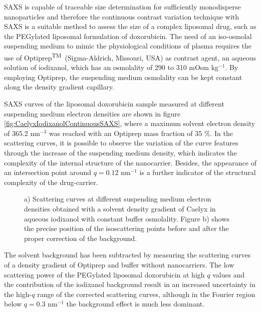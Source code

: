 SAXS is capable of traceable size determination for sufficiently monodisperse nanoparticles \citep{meli_traceable_2012} and therefore the continuous contrast variation technique with SAXS is a suitable method to assess the size of a complex liposomal drug, such as the PEGylated liposomal formulation of doxorubicin. The need of an iso-osmolal suspending medium to mimic the physiological conditions of plasma requires the use of Optiprep\textsuperscript{TM}\ (Sigma-Aldrich, Missouri, USA) as contrast agent, an aqueous solution of iodixanol, which has an osmolality of 290 to 310 mOsm kg$^{-1}$. By employing Optiprep, the suspending medium osmolality can be kept constant along the density gradient capillary.
 
SAXS curves of the liposomal doxorubicin sample measured at different suspending medium electron densities are shown in figure \ref{fig:CaelyxIodixanolContinuousSAXS}, where a maximum solvent electron density of 365.2 nm$^{-3}$ was reached with an Optiprep mass fraction of 35 $\%$. In the scattering curves, it is possible to observe the variation of the curve features through the increase of the suspending medium density, which indicates the complexity of the internal structure of the nanocarrier. Besides, the appearance of an intersection point around $q = 0.12$ nm$^{-1}$ is a further indicator of the structural complexity of the drug-carrier.

\begin{figure}
	\centering
		\qquad
		\caption[Continuous contrast variation experimental data of Caelyx.]{ a) Scattering curves at different suspending medium electron densities obtained with a solvent density gradient of Caelyx in aqueous iodixanol with constant buffer osmolality. Figure b) shows the precise position of the isoscattering points before and after the proper correction of the background.}
\end{figure}

The solvent background has been subtracted by measuring the scattering curves of a density gradient of Optiprep and buffer without nanocarriers. The low scattering power of the PEGylated liposomal doxorubicin at high $q$ values and the contribution of the iodixanol background result in an increased uncertainty in the high-$q$ range of the corrected scattering curves, although in the Fourier region below $q = 0.3$ nm$^{-1}$ the background effect is much less dominant.

